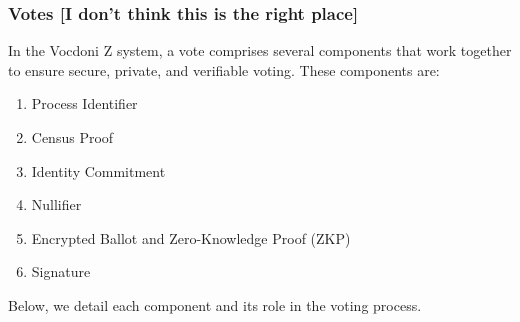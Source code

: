 \subsubsection{Votes [I don't think this is the right place]}

In the Vocdoni Z system, a vote comprises several components that work together to ensure secure, private, and verifiable voting. These components are:

\begin{enumerate}
	\item Process Identifier
	\item Census Proof
	\item Identity Commitment
	\item Nullifier
	\item Encrypted Ballot and Zero-Knowledge Proof (ZKP)
	\item Signature	
\end{enumerate}

Below, we detail each component and its role in the voting process.

